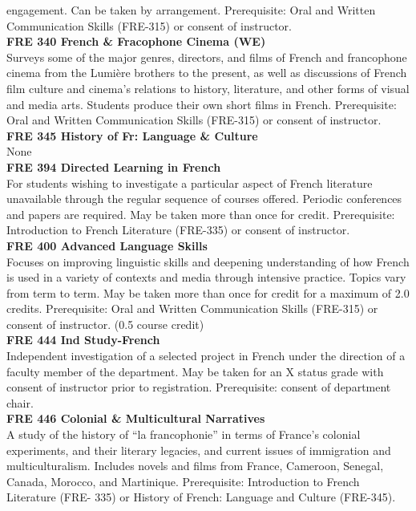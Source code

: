\documentclass[
  letterpaper,
]{scrbook}
\begin{document}
engagement. Can be taken by arrangement. Prerequisite: Oral and Written
Communication Skills (FRE-315) or consent of instructor.\\
\textbf{FRE 340 French \& Fracophone Cinema (WE)}\\
Surveys some of the major genres, directors, and films of French and
francophone cinema from the Lumière brothers to the present, as well as
discussions of French film culture and cinema's relations to history,
literature, and other forms of visual and media arts. Students produce
their own short films in French. Prerequisite: Oral and Written
Communication Skills (FRE-315) or consent of instructor.\\
\textbf{FRE 345 History of Fr: Language \& Culture}\\
None\\
\textbf{FRE 394 Directed Learning in French}\\
For students wishing to investigate a particular aspect of French
literature unavailable through the regular sequence of courses offered.
Periodic conferences and papers are required. May be taken more than
once for credit. Prerequisite: Introduction to French Literature
(FRE-335) or consent of instructor.\\
\textbf{FRE 400 Advanced Language Skills}\\
Focuses on improving linguistic skills and deepening understanding of
how French is used in a variety of contexts and media through intensive
practice. Topics vary from term to term. May be taken more than once for
credit for a maximum of 2.0 credits. Prerequisite: Oral and Written
Communication Skills (FRE-315) or consent of instructor. (0.5 course
credit)\\
\textbf{FRE 444 Ind Study-French}\\
Independent investigation of a selected project in French under the
direction of a faculty member of the department. May be taken for an X
status grade with consent of instructor prior to registration.
Prerequisite: consent of department chair.\\
\textbf{FRE 446 Colonial \& Multicultural Narratives}\\
A study of the history of ``la francophonie'' in terms of France's
colonial experiments, and their literary legacies, and current issues of
immigration and multiculturalism. Includes novels and films from France,
Cameroon, Senegal, Canada, Morocco, and Martinique. Prerequisite:
Introduction to French Literature (FRE- 335) or History of French:
Language and Culture (FRE-345).\\
\end{document}
